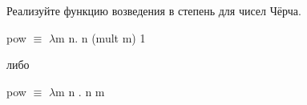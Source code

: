 \documentclass[a4paper,12pt]{article} %
\begin{document}
\begin{enumerate}
\begin{enumerate}
\end{enumerate}

{\item Реализуйте функцию возведения в степень для чисел Чёрча.}

    \begin{adjustwidth}{1em}{0pt}
    pow $\equiv$ $\lambda$m n. n (mult m) 1
    
    либо
    
    pow $\equiv$ $\lambda$m n . n m
    \end{adjustwidth}

\end{enumerate}
\end{document}
